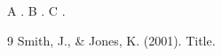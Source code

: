\documentclass{article}
\begin{document}
A . B \citeauthor{a}. C \cite{a}.
\begin{thebibliography}{9}
 Smith, J., \& Jones, K. (2001). Title.
\end{thebibliography}
\end{document}
